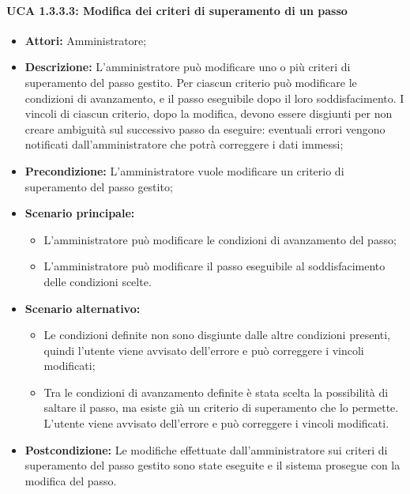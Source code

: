 \paragraph{UCA 1.3.3.3: Modifica dei criteri di superamento di un passo}
\begin{itemize}
\item \textbf{Attori:}
 Amministratore;
\item \textbf{Descrizione:} 
L'amministratore può modificare uno o più criteri di superamento del passo gestito.
Per ciascun criterio può modificare le condizioni di avanzamento, e il passo eseguibile dopo il loro soddisfacimento.
I vincoli di ciascun criterio, dopo la modifica, devono essere disgiunti per non creare ambiguità sul successivo passo da eseguire: eventuali
errori vengono notificati dall'amministratore che potrà correggere i dati immessi;
\item \textbf{Precondizione:}
 L'amministratore vuole modificare un criterio di superamento del passo gestito;
\item \textbf{Scenario principale:} 
\begin{itemize}
\item L'amministratore può modificare le condizioni di avanzamento del passo;
\item L'amministratore può modificare il passo eseguibile al soddisfacimento delle condizioni scelte.
\end{itemize}
\item \textbf{Scenario alternativo:}
\begin{itemize}
\item Le condizioni definite non sono disgiunte dalle altre condizioni presenti, quindi l'utente viene avvisato dell'errore e può correggere i vincoli modificati;
\item Tra le condizioni di avanzamento definite è stata scelta la possibilità di saltare il passo, ma esiste già un criterio di superamento che lo permette. L'utente viene avvisato dell'errore e può correggere i vincoli modificati.
\end{itemize}
\item \textbf{Postcondizione:}
 Le modifiche effettuate dall'amministratore sui criteri di superamento del passo gestito sono state eseguite e il sistema prosegue con la modifica del passo. 
\end{itemize}

